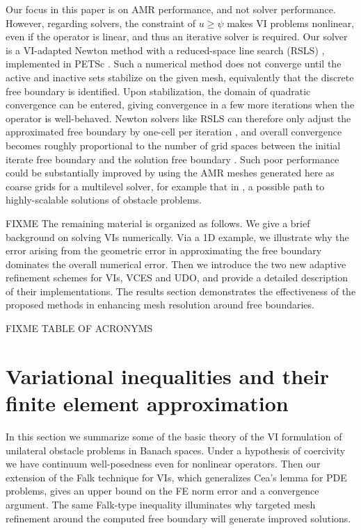 \documentclass[]{interact}
\theoremstyle{plain}%
\theoremstyle{definition}
\theoremstyle{remark}
\begin{document}
Our focus in this paper is on AMR performance, and not solver performance.  However, regarding solvers, the constraint of $u \geq \psi$ makes VI problems nonlinear, even if the operator is linear, and thus an iterative solver is required.  Our solver is a VI-adapted Newton method with a reduced-space line search (RSLS) \cite{BensonMunson2006}, implemented in PETSc \cite{petsc-user-ref}.  Such a numerical method does not converge until the active and inactive sets stabilize on the given mesh, equivalently that the discrete free boundary is identified.  Upon stabilization, the domain of quadratic convergence can be entered, giving convergence in a few more iterations when the operator is well-behaved.  Newton solvers like RSLS can therefore only adjust the approximated free boundary by one-cell per iteration \citep{GraeserKornhuber2009}, and overall convergence becomes roughly proportional to the number of grid spaces between the initial iterate free boundary and the solution free boundary \citep{Bueler2021}.  Such poor performance could be substantially improved by using the AMR meshes generated here as coarse grids for a multilevel solver, for example that in \cite{BuelerFarrell2024}, a possible path to highly-scalable solutions of obstacle problems.

FIXME The remaining material is organized as follows.  We give a brief background on solving VIs numerically.  Via a 1D example, we illustrate why the error arising from the geometric error in approximating the free boundary dominates the overall numerical error.   Then we introduce the two new adaptive refinement schemes for VIs, VCES and UDO, and provide a detailed description of their implementations.  The results section demonstrates the effectiveness of the proposed methods in enhancing mesh resolution around free boundaries. 

FIXME TABLE OF ACRONYMS


\section{Variational inequalities and their finite element approximation} \label{sec:vifem}

In this section we summarize some of the basic theory of the VI formulation of unilateral obstacle problems in Banach spaces.  Under a hypothesis of coercivity we have continuum well-posedness even for nonlinear operators.  Then our extension of the Falk \cite{Falk1974} technique for VIs, which generalizes Cea's lemma \cite{ElmanSilvesterWathen2014} for PDE problems, gives an upper bound on the FE norm error and a convergence argument.  The same Falk-type inequality illuminates why targeted mesh refinement around the computed free boundary will generate improved solutions.
\end{document}
